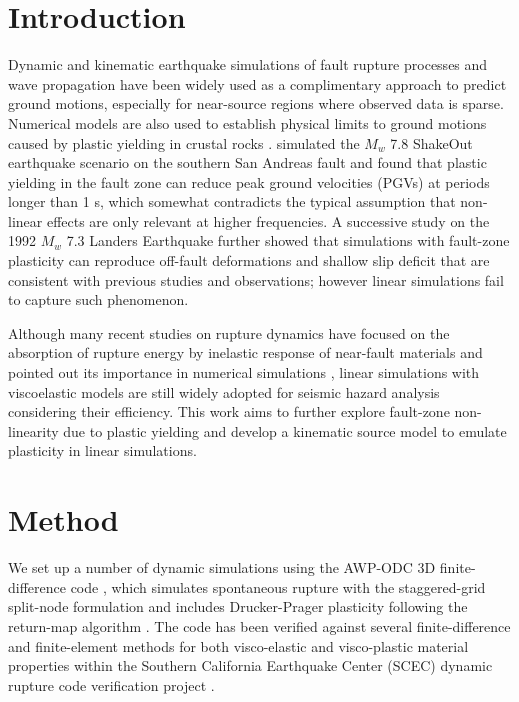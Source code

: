 \section{Introduction} \label{eks:intro}
Dynamic and kinematic earthquake simulations of fault rupture processes and wave propagation have been widely used as a complimentary approach to predict ground motions, especially for near-source regions where observed data is sparse. Numerical models are also used to establish physical limits to ground motions caused by plastic yielding in crustal rocks . \citet{rotenExpectedSeismicShaking2014} simulated the $M_w$ 7.8 ShakeOut earthquake scenario on the southern San Andreas fault and found that plastic yielding in the fault zone can reduce peak ground velocities (PGVs) at periods longer than 1 s, which somewhat contradicts the typical assumption that non-linear effects are only relevant at higher frequencies. A successive study \citep{rotenOfffaultDeformationsShallow2017} on the 1992 $M_w$ 7.3 Landers Earthquake further showed that simulations with fault-zone plasticity can reproduce off-fault deformations and shallow slip deficit that are consistent with previous studies and observations; however linear simulations fail to capture such phenomenon.

Although many recent studies on rupture dynamics have focused on the absorption of rupture energy by inelastic response of near-fault materials and pointed out its importance in numerical simulations , linear simulations with viscoelastic models are still widely adopted for seismic hazard analysis considering their efficiency. This work aims to further explore fault-zone non-linearity due to plastic yielding and develop a kinematic source model to emulate plasticity in linear simulations.



\section{Method}\label{eks:method}
We set up a number of dynamic simulations using the AWP-ODC 3D finite-difference code \citep{olsenThreeDimensionalSimulationMagnitude1995,dayMemoryEfficientSimulationAnelastic2001,cuiScalableEarthquakeSimulation2010}, which simulates spontaneous rupture with the staggered-grid split-node formulation \citep{dalguer2007staggered} and includes Drucker-Prager plasticity following the return-map algorithm \citep{rotenOfffaultDeformationsShallow2017}. The code has been verified against several finite-difference and finite-element methods for both visco-elastic and visco-plastic material properties within the Southern California Earthquake Center (SCEC) dynamic rupture code verification project \citep{harris2009scec,harris2011verifying}.

